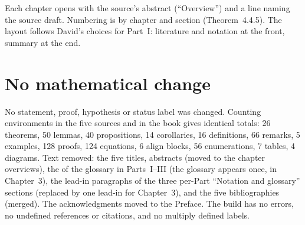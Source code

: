 \documentclass[11pt]{article}
\begin{document}
\noindent Each chapter opens with the source's abstract (``Overview'')
and a line naming the source draft.  Numbering is by chapter and
section (Theorem~4.4.5).  The layout follows David's choices for Part~I:
literature and notation at the front, summary at the end.

\section*{No mathematical change}
No statement, proof, hypothesis or status label was changed.  Counting
environments in the five sources and in the book gives identical
totals: 26 theorems, 50 lemmas, 40 propositions, 14 corollaries,
16 definitions, 66 remarks, 5 examples, 128 proofs, 124 equations,
6 align blocks, 56 enumerations, 7 tables, 4 diagrams.  Text removed:
the five titles, abstracts (moved to the chapter overviews), the
\verb|| of the glossary in Parts~I--III (the glossary appears once,
in Chapter~3), the lead-in paragraphs of the three per-Part ``Notation and
glossary'' sections (replaced by one lead-in for Chapter~3), and the
five bibliographies (merged).  The acknowledgments moved to the Preface.
The build has no errors, no undefined references or citations, and no
multiply defined labels.
\end{document}
